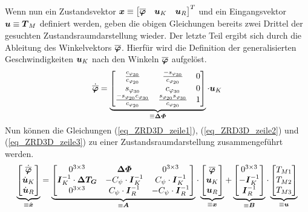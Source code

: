Wenn nun ein Zustandsvektor $\boldsymbol{x} \equiv \begin{bmatrix} \boldsymbol{\overline{\varphi}} & \boldsymbol{u}_K & \boldsymbol{u}_R\end{bmatrix}^T$ und ein Eingangsvektor $\boldsymbol{u} \equiv \boldsymbol{T}_M$ definiert werden, geben die obigen Gleichungen bereits zwei Drittel der gesuchten Zustandsraumdarstellung wieder. Der letzte Teil ergibt sich durch die Ableitung des Winkelvektors $\boldsymbol{\overline{\varphi}}$. Hierfür wird die Definition der generalisierten Geschwindigkeiten $\boldsymbol{u}_K$ nach den Winkeln $\boldsymbol{\overline{\varphi}}$ aufgelöst.
\begin{equation}
\label{eq_ZRD3D_zeile1}
\dot{\boldsymbol{\overline{\varphi}}} = \underbrace{\begin{bmatrix}
\frac{c_{\varphi_{30}}}{c_{\varphi_{20}}} & \frac{-s_{\varphi_{30}}}{c_{\varphi_{20}}} & 0 
\\
s_{\varphi_{30}} & c_{\varphi_{30}} & 0 
\\
\frac{-s_{\varphi_{20}}c_{\varphi_{30}}}{c_{\varphi_{20}}} &
\frac{s_{\varphi_{20}}s_{\varphi_{30}}}{c_{\varphi_{20}}} & 1
\end{bmatrix}}_{\equiv \boldsymbol{\Delta\varPhi}}\cdot \boldsymbol{u}_K
\end{equation}
Nun können die Gleichungen (\ref{eq_ZRD3D_zeile1}), (\ref{eq_ZRD3D_zeile2}) und (\ref{eq_ZRD3D_zeile3}) zu einer Zustandsraumdarstellung zusammengeführt werden.
\begin{equation}
\underbrace{\begin{bmatrix} \dot{\boldsymbol{\overline{\varphi}}} \\ \dot{\boldsymbol{u}}_K \\ \dot{\boldsymbol{u}}_R \end{bmatrix}}_{\equiv \dot{\boldsymbol{x}}} 
= 
\underbrace{\begin{bmatrix}
0^{3\times 3} & \boldsymbol{\Delta\varPhi} & 0^{3\times 3} \\
\boldsymbol{I}^{-1}_K \cdot \boldsymbol{\Delta T_G} & -C_{\psi}\cdot \boldsymbol{I}^{-1}_K & C_{\psi}\cdot \boldsymbol{I}^{-1}_K \\
0^{3\times 3} & C_{\psi}\cdot \boldsymbol{I}^{-1}_R & -C_{\psi}\cdot \boldsymbol{I}^{-1}_R
\end{bmatrix}}_{\equiv \boldsymbol{A}}
\cdot
\underbrace{\begin{bmatrix}\boldsymbol{\overline{\varphi}} \\ \boldsymbol{u}_K \\ \boldsymbol{u}_R\end{bmatrix}}_{\equiv \boldsymbol{x}}
+
\underbrace{\begin{bmatrix}
0^{3\times 3} \\ -\boldsymbol{I}^{-1}_K \\ \boldsymbol{I}^{-1}_R
\end{bmatrix}}_{\equiv \boldsymbol{B}}
\cdot
\underbrace{\begin{bmatrix}
T_{M1} \\ T_{M2} \\ T_{M3}
\end{bmatrix}}_{\equiv \boldsymbol{u}}
\end{equation}